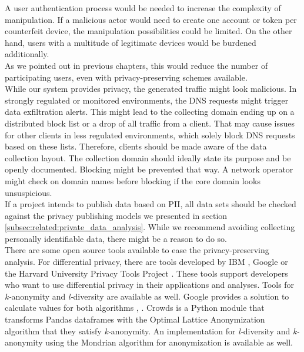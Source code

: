     A user authentication process would be needed to increase the complexity of manipulation. If a malicious actor would need to create one account or token per counterfeit device, the manipulation possibilities could be limited. On the other hand, users with a multitude of legitimate devices would be burdened additionally.\\ 
    As we pointed out in previous chapters, this would reduce the number of participating users, even with privacy-preserving schemes available.\\

    
    While our system provides privacy, the generated traffic might look malicious.
    In strongly regulated or monitored environments, the DNS requests might trigger data exfiltration alerts. This might lead to the collecting domain ending up on a distributed block list or a drop of all traffic from a client. That may cause issues for other clients in less regulated environments, which solely block DNS requests based on these lists.
    Therefore, clients should be made aware of the data collection layout. The collection domain should ideally state its purpose and be openly documented. Blocking might be prevented that way. A network operator might check on domain names before blocking if the core domain looks unsuspicious.\\

    If a project intends to publish data based on PII, all data sets should be checked against the privacy publishing models we presented in section \ref{subsec:related:private_data_analysis}. While we recommend avoiding collecting personally identifiable data, there might be a reason to do so.\\
    There are some open source tools available to ease the privacy-preserving analysis.
    For differential privacy, there are tools developed by IBM \cite{noauthor_ibmdifferential-privacy-library_2021}, Google \cite{noauthor_googledifferential-privacy_2021} or the Harvard University Privacy Tools Project \cite{salil_vadhan_opendp_nodate}. These tools support developers who want to use differential privacy in their applications and analyses.
    Tools for \textit{k-}anonymity and \textit{l-}diversity are available as well. 
    Google provides a solution to calculate values for both algorithms \cite{noauthor_computing_nodate}, \cite{noauthor_computing_nodate-1}. 
    Crowds \cite{mazzone_leo-mazzcrowds_2021} is a Python module that transforms Pandas dataframes with the Optimal Lattice Anonymization algorithm that they satisfy \textit{k-}anonymity. An implementation for \textit{l-}diversity \cite{gong_qiyuangongmondrian_l_diversity_2021} and \textit{k-}anonymity \cite{gong_qiyuangongmondrian_2021} using the Mondrian algorithm for anonymization is available as well.

